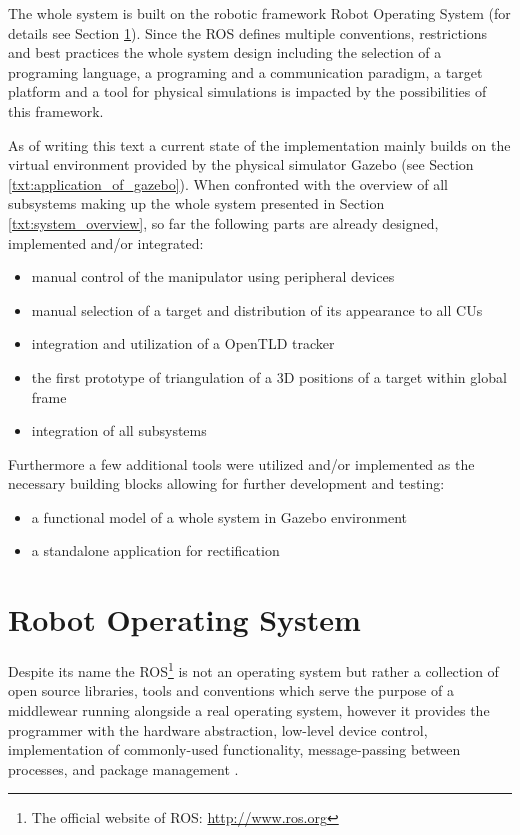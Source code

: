 The whole system is built on the robotic framework Robot Operating System (for details see Section \ref{txt:robot_operating_system}). Since the ROS defines multiple conventions, restrictions and best practices the whole system design including the selection of a programing language, a programing and a communication paradigm, a target platform and a tool for physical simulations is impacted by the possibilities of this framework.

As of writing this text a current state of the implementation mainly builds on the virtual environment provided by the physical simulator Gazebo (see Section \ref{txt:application_of_gazebo}). When confronted with the overview of all subsystems making up the whole system presented in Section \ref{txt:system_overview}, so far the following parts are already designed, implemented and/or integrated:

\begin{itemize}
\item manual control of the manipulator using peripheral devices
\item manual selection of a target and distribution of its appearance to all CUs
\item integration and utilization of a OpenTLD tracker
\item the first prototype of triangulation of a 3D positions of a target within global frame
\item integration of all subsystems
\end{itemize}

Furthermore a few additional tools were utilized and/or implemented as the necessary building blocks allowing for further development and testing:

\begin{itemize}
\item a functional model of a whole system in Gazebo environment
\item a standalone application for rectification
\end{itemize}


\section{Robot Operating System} \label{txt:robot_operating_system}

Despite its name the ROS\footnote{The official website of ROS: \url{http://www.ros.org}} is not an operating system but rather a collection of open source libraries, tools and conventions which serve the purpose of a middlewear running alongside a real operating system, however it provides the programmer with the hardware abstraction,  low-level device control, implementation of commonly-used functionality,
message-passing between processes, and package management \cite{O'Kane201310}.

